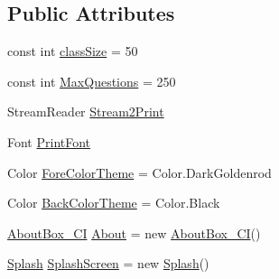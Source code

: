 \subsection*{\-Public \-Attributes}
\begin{DoxyCompactItemize}
\item 
const int \hyperlink{class_sr_p___classroom_inq_1_1frm_classrrom_inq_a78d9aab335edfe53d39036b9d89928a8}{class\-Size} = 50
\item 
const int \hyperlink{class_sr_p___classroom_inq_1_1frm_classrrom_inq_abbcb6a4a2ba214bc7aab16386f0e8c98}{\-Max\-Questions} = 250
\item 
\-Stream\-Reader \hyperlink{class_sr_p___classroom_inq_1_1frm_classrrom_inq_aa030f46a7915eae3a0b8b88661be51a8}{\-Stream2\-Print}
\item 
\-Font \hyperlink{class_sr_p___classroom_inq_1_1frm_classrrom_inq_a314e4a61ea8458c5198273335dcf0b5f}{\-Print\-Font}
\item 
\-Color \hyperlink{class_sr_p___classroom_inq_1_1frm_classrrom_inq_ac239384db4489bc4b8b2a4cee9280849}{\-Fore\-Color\-Theme} = \-Color.\-Dark\-Goldenrod
\item 
\-Color \hyperlink{class_sr_p___classroom_inq_1_1frm_classrrom_inq_a29b5dc6ea05e60bb2577a5bef3532d7b}{\-Back\-Color\-Theme} = \-Color.\-Black
\item 
\hyperlink{class_sr_p___classroom_inq_1_1_about_box___c_i}{\-About\-Box\-\_\-\-C\-I} \hyperlink{class_sr_p___classroom_inq_1_1frm_classrrom_inq_aa797137da7c6757a4fc98c07d41928db}{\-About} = new \hyperlink{class_sr_p___classroom_inq_1_1_about_box___c_i}{\-About\-Box\-\_\-\-C\-I}()
\item 
\hyperlink{class_sr_p___classroom_inq_1_1_splash}{\-Splash} \hyperlink{class_sr_p___classroom_inq_1_1frm_classrrom_inq_a98e4b48609bbf222068559db81f53f9d}{\-Splash\-Screen} = new \hyperlink{class_sr_p___classroom_inq_1_1_splash}{\-Splash}()
\end{DoxyCompactItemize}
